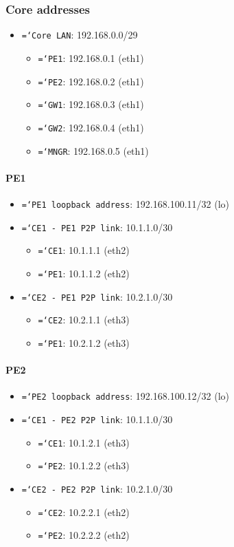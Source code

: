 \documentclass{report}
\newcommand{\monospaced}[1]{\texttt{\hyphenchar\font=`\-#1}}
\begin{document}
\subsubsection{Core addresses}
\begin{itemize}
    \item \monospaced{Core LAN}: 192.168.0.0/29
    \begin{itemize}
        \item \monospaced{PE1}: 192.168.0.1 (eth1)
        \item \monospaced{PE2}: 192.168.0.2 (eth1)
        \item \monospaced{GW1}: 192.168.0.3 (eth1)
        \item \monospaced{GW2}: 192.168.0.4 (eth1)
        \item \monospaced{MNGR}: 192.168.0.5 (eth1)
    \end{itemize}
\end{itemize}
\paragraph{PE1}
\begin{itemize}
    \item \monospaced{PE1 loopback address}: 192.168.100.11/32 (lo)
    \item \monospaced{CE1 - PE1 P2P link}: 10.1.1.0/30
    \begin{itemize}
        \item \monospaced{CE1}: 10.1.1.1 (eth2)
        \item \monospaced{PE1}: 10.1.1.2 (eth2)
    \end{itemize}
    \item \monospaced{CE2 - PE1 P2P link}: 10.2.1.0/30
    \begin{itemize}
        \item \monospaced{CE2}: 10.2.1.1 (eth3)
        \item \monospaced{PE1}: 10.2.1.2 (eth3)
    \end{itemize}
\end{itemize}
\paragraph{PE2}
\begin{itemize}
    \item \monospaced{PE2 loopback address}: 192.168.100.12/32 (lo)
    \item \monospaced{CE1 - PE2 P2P link}: 10.1.1.0/30
    \begin{itemize}
        \item \monospaced{CE1}: 10.1.2.1 (eth3)
        \item \monospaced{PE2}: 10.1.2.2 (eth3)
    \end{itemize}
    \item \monospaced{CE2 - PE2 P2P link}: 10.2.1.0/30
    \begin{itemize}
        \item \monospaced{CE2}: 10.2.2.1 (eth2)
        \item \monospaced{PE2}: 10.2.2.2 (eth2)
    \end{itemize}
\end{itemize}
\end{document}
